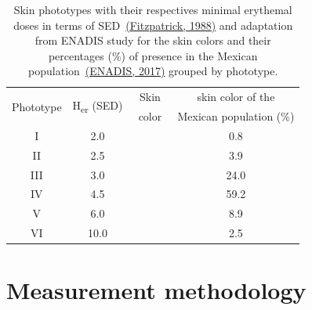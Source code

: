 \documentclass[10pt]{article}
\begin{document}
\begin{table}[H]
  \centering
    \begin{tabular}{ccccccc}
         \multirow{2}{*}{Phototype}& \multirow{2}{*}{H\textsubscript{er} (SED)} & \multicolumn{4}{c}{Skin} & skin color of the\\
         & & \multicolumn{4}{c}{color} & Mexican population (\%) \\  \hline
        I 	&2.0	&\cellcolor[RGB]{251, 244, 227}\hspace*{0.05cm} 	&\cellcolor[RGB]{245, 240, 218}\hspace*{0.05cm}  &\cellcolor[RGB]{247, 238, 217}\hspace*{0.05cm} 	&\cellcolor[RGB]{248, 234, 209} \hspace*{0.05cm} &0.8	\\ \hline
        II 	&2.5	&\cellcolor[RGB]{248, 234, 208}	&\cellcolor[RGB]{247, 231, 206} &\cellcolor[RGB]{247, 223, 199}	&\cellcolor[RGB]{245, 222, 188}	& 3.9 \\ \hline
        III &3.0 	&\cellcolor[RGB]{245, 221, 188}	&\cellcolor[RGB]{238, 213, 170} &\cellcolor[RGB]{219,182,137}	&\cellcolor[RGB]{220,170,120} &24.0	\\ \hline
        IV 	&4.5	&\cellcolor[RGB]{219, 191, 129}	&\cellcolor[RGB]{208, 171, 107} &\cellcolor[RGB]{193, 150, 90}	&\cellcolor[RGB]{182, 135, 75}&59.2	\\ \hline
        V	&6.0	&\cellcolor[RGB]{172, 121, 68}	&\cellcolor[RGB]{135, 92, 50}  &\cellcolor[RGB]{113, 70, 38}	&\cellcolor[RGB]{77, 48, 28}&8.9	\\ \hline
        VI 	&10.0 	&\cellcolor[RGB]{68, 37, 20}	&\cellcolor[RGB]{43, 25, 8}  &\cellcolor[RGB]{32, 12, 7}	&\cellcolor[RGB]{10, 2, 5}	&2.5	\\ \hline
    \end{tabular}
\caption{Skin phototypes with their respectives minimal erythemal doses in terms
of SED~\protect\hyperref[csl:30]{(Fitzpatrick, 1988)} and adaptation from ENADIS study for the skin
colors and their percentages (\%) of presence in the Mexican
population~\protect\hyperref[csl:49]{(ENADIS, 2017)} grouped by phototype.\label{290967}
}
\end{table}

\section*{Measurement methodology}

{\label{321063}}
\end{document}
